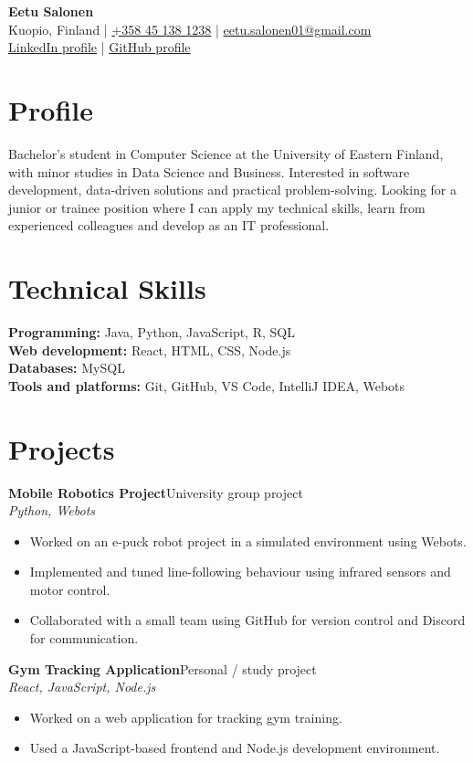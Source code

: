 \documentclass[a4paper,10pt]{article}
\newcommand{\cvItem}[1]{\item \small{#1}}
\newcommand{\cvProject}[3]{%
  \textbf{#1}\hfill {\small #2}\\
  \textit{\small #3}\\[-3pt]
}
\begin{document}
\begin{center}
  {\Huge\bfseries Eetu Salonen}\\[4pt]
  {\small Kuopio, Finland \;|\;
  \href{tel:+358451381238}{+358 45 138 1238} \;|\;
  \href{mailto:eetu.salonen01@gmail.com}{eetu.salonen01@gmail.com}}\\[2pt]
  {\small
  \href{https://www.linkedin.com/}{LinkedIn profile} \;|\;
  \href{https://github.com/}{GitHub profile}}
\end{center}

\section*{Profile}
Bachelor's student in Computer Science at the University of Eastern Finland,
with minor studies in Data Science and Business. Interested in software
development, data-driven solutions and practical problem-solving. Looking for
a junior or trainee position where I can apply my technical skills, learn from
experienced colleagues and develop as an IT professional.

\section*{Technical Skills}
\small
\textbf{Programming:} Java, Python, JavaScript, R, SQL\\
\textbf{Web development:} React, HTML, CSS, Node.js\\
\textbf{Databases:} MySQL\\
\textbf{Tools and platforms:} Git, GitHub, VS Code, IntelliJ IDEA, Webots
\normalsize

\section*{Projects}

\cvProject{Mobile Robotics Project}{University group project}{Python, Webots}
\begin{itemize}
  \cvItem{Worked on an e-puck robot project in a simulated environment using Webots.}
  \cvItem{Implemented and tuned line-following behaviour using infrared sensors and motor control.}
  \cvItem{Collaborated with a small team using GitHub for version control and Discord for communication.}
\end{itemize}

\cvProject{Gym Tracking Application}{Personal / study project}{React, JavaScript, Node.js}
\begin{itemize}
  \cvItem{Worked on a web application for tracking gym training.}
  \cvItem{Used a JavaScript-based frontend and Node.js development environment.}
\end{itemize}
\end{document}
